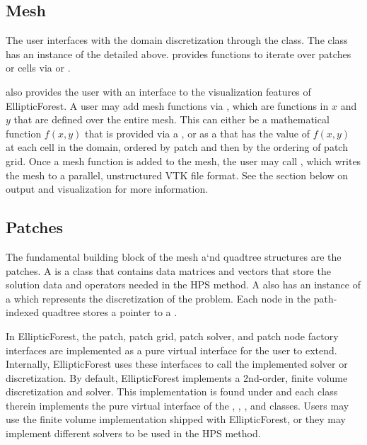\subsection{Mesh}

The user interfaces with the domain discretization through the  class. The  class has an instance of the  detailed above.  provides functions to iterate over patches or cells via  or .

 also provides the user with an interface to the visualization features of EllipticForest. A user may add mesh functions via , which are functions in $x$ and $y$ that are defined over the entire mesh. This can either be a mathematical function $f(x,y)$ that is provided via a , or as a  that has the value of $f(x,y)$ at each cell in the domain, ordered by patch and then by the ordering of patch grid. Once a mesh function is added to the mesh, the user may call , which writes the mesh to a parallel, unstructured VTK file format. See the section below on output and visualization for more information.

\subsection{Patches}

The fundamental building block of the mesh a`nd quadtree structures are the patches. A  is a class that contains data matrices and vectors that store the solution data and operators needed in the HPS method. A  also has an instance of a  which represents the discretization of the problem. Each node in the path-indexed quadtree stores a pointer to a .

In EllipticForest, the patch, patch grid, patch solver, and patch node factory interfaces are implemented as a pure virtual interface for the user to extend. Internally, EllipticForest uses these interfaces to call the implemented solver or discretization. By default, EllipticForest implements a 2nd-order, finite volume discretization and solver. This implementation is found under  and each class therein implements the pure virtual interface of the , , , and  classes. Users may use the finite volume implementation shipped with EllipticForest, or they may implement different solvers to be used in the HPS method.

